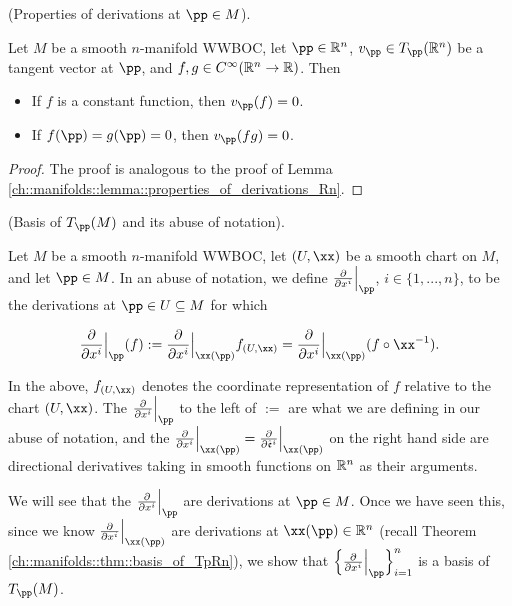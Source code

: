 \begin{theorem}
     (Properties of derivations at $\pp \in M$).
    
    Let $M$ be a smooth $n$-manifold WWBOC, let $\pp \in \R^n$, $v_\pp \in T_\pp(\R^n)$ be a tangent vector at $\pp$, and $f, g \in C^\infty(\mathbb{R}^n \rightarrow \mathbb{R})$. Then
    
    \begin{itemize}
        \item If $f$ is a constant function, then $v_\pp(f) = 0$.
        \item If $f(\pp) = g(\pp) = 0$, then $v_\pp(fg) = 0$.
    \end{itemize}
\end{theorem}
    
\begin{proof}
    The proof is analogous to the proof of Lemma \ref{ch::manifolds::lemma::properties_of_derivations_Rn}.
\end{proof}
    
\begin{defn}
\label{ch::manifolds::defn::basis_of_TpM}
     (Basis of $T_\pp(M)$ and its abuse of notation).
    
    Let $M$ be a smooth $n$-manifold WWBOC, let $(U, \xx)$ be a smooth chart on $M$, and let $\pp \in M$. In an abuse of notation, we define $\frac{\pd}{\pd x^i}\Big|_\pp$, $i \in \{1, ..., n\}$, to be the derivations at $\pp \in U \subseteq M$ for which
    
    \begin{align*}
        \frac{\pd}{\pd x^i}\Big|_\pp(f) := \frac{\pd}{\pd x^i}\Big|_{\xx(\pp)} f_{(U, \xx)} = \frac{\pd}{\pd x^i}\Big|_{\xx(\pp)} (f \circ \xx^{-1}).
    \end{align*}
    
    In the above, $f_{(U, \xx)}$ denotes the coordinate representation of $f$ relative to the chart $(U, \xx)$. The $\frac{\pd}{\pd x^i}\Big|_\pp$ to the left of $:=$ are what we are defining in our abuse of notation, and the $\frac{\pd}{\pd x^i}\Big|_{\xx(\pp)} = \frac{\pd}{\pd \see^i}\Big|_{\xx(\pp)}$ on the right hand side are directional derivatives taking in smooth functions on $\mathbb{R}^n$ as their arguments. 
    
    We will see that the $\frac{\pd}{\pd x^i}\Big|_\pp$ are derivations at $\pp \in M$. Once we have seen this, since we know $\frac{\pd}{\pd x^i}\Big|_{\xx(\pp)}$ are derivations at $\xx(\pp) \in \R^n$ (recall Theorem \ref{ch::manifolds::thm::basis_of_TpRn}), we show that $\Big\{ \frac{\pd}{\pd x^i}\Big|_\pp \Big\}_{i = 1}^n$ is a basis of $T_\pp(M)$.
\end{defn}

